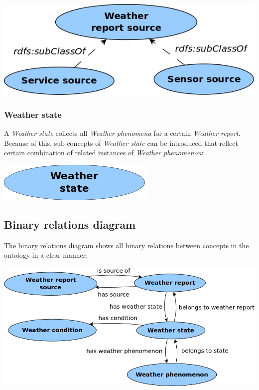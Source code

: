 \begin{center}
  \includegraphics[width=.5\textwidth]{figures/diagrams/weather-report-source.png}
\end{center}

\subsubsection{Weather state}

A \emph{Weather state} collects all \emph{Weather phenomena} for a certain \emph{Weather report}. Because of this, sub-concepts of \emph{Weather state} can be introduced that reflect certain combination of related instances of \emph{Weather phenomenon}:

\begin{center}
  \includegraphics[width=.3\textwidth]{figures/diagrams/weather-state.png}
\end{center}

\subsection{Binary relations diagram}
\label{sec:binary_relations_diagram}

The binary relations diagram shows all binary relations between concepts in the ontology in a clear manner:

\begin{center}
  \includegraphics[width=\textwidth]{figures/diagrams/binary-relations.png}
\end{center}

